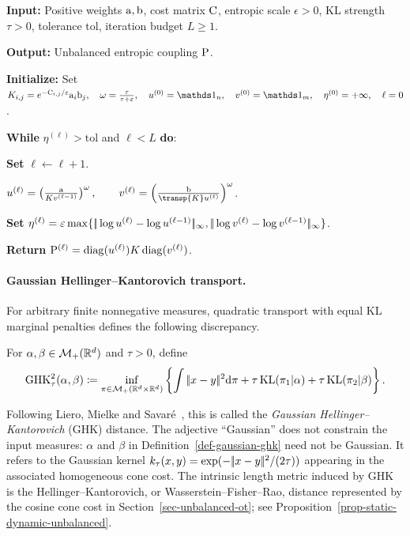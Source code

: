 \begin{alg}\label{alg:unbalanced-sinkhorn}
\textbf{Input:} Positive weights $\a,\b$, cost matrix $\C$, entropic scale $\epsilon>0$, KL strength $\tau>0$, tolerance $\mathrm{tol}$, iteration budget $L\geq1$.

\textbf{Output:} Unbalanced entropic coupling $\P$.

\textbf{Initialize:} Set
\(K_{i,j}=e^{-\C_{i,j}/\epsilon}\a_i\b_j, \quad \omega=\frac{\tau}{\tau+\epsilon}, \quad u^{(0)}=\ones_n, \quad v^{(0)}=\ones_m, \quad \eta^{(0)}=+\infty, \quad \ell=0\).

\textbf{While} \(\eta^{(\ell)}>\mathrm{tol}\) and $\ell<L$ \textbf{do}:
\begin{algblock}

\textbf{Set} \(\ell\leftarrow \ell+1\).

\(u^{(\ell)} = \left(\frac{\a}{K v^{(\ell-1)}}\right)^\omega, \qquad v^{(\ell)} = \left(\frac{\b}{\transp{K}u^{(\ell)}}\right)^\omega\).

\textbf{Set} \(\eta^{(\ell)}=\epsilon\max\{\norm{\log u^{(\ell)}-\log u^{(\ell-1)}}_\infty,\norm{\log v^{(\ell)}-\log v^{(\ell-1)}}_\infty\}\).
\end{algblock}
\algreturnskip
\textbf{Return} \(\P^{(\ell)}=\diag(u^{(\ell)})K\diag(v^{(\ell)})\).
\end{alg}

\paragraph{Gaussian Hellinger--Kantorovich transport.}
For arbitrary finite nonnegative measures, quadratic transport with equal KL marginal penalties defines the following discrepancy.
\begin{defn}\label{def-gaussian-ghk}
For $\alpha,\beta\in\Mm_+(\RR^d)$ and $\tau>0$, define
\begin{equation}\label{eq-gaussian-ghk-endpoint}
\operatorname{GHK}_\tau^2(\alpha,\beta)
\eqdef
\inf_{\pi\in\Mm_+(\RR^d\times\RR^d)}
\left\{
\int\norm{x-y}^2\d\pi
+\tau\KL(\pi_1|\alpha)
+\tau\KL(\pi_2|\beta)
\right\}.
\end{equation}
\end{defn}
Following Liero, Mielke and Savar\'e~\cite{LieroMielkeSavareLong}, this is called the \emph{Gaussian Hellinger--Kantorovich} (GHK) distance. The adjective ``Gaussian'' does not constrain the input measures: $\alpha$ and $\beta$ in Definition~\ref{def-gaussian-ghk} need not be Gaussian. It refers to the Gaussian kernel $k_\tau(x,y)=\exp(-\norm{x-y}^2/(2\tau))$ appearing in the associated homogeneous cone cost. The intrinsic length metric induced by GHK is the Hellinger--Kantorovich, or Wasserstein--Fisher--Rao, distance represented by the cosine cone cost in Section~\ref{sec-unbalanced-ot}; see Proposition~\ref{prop-static-dynamic-unbalanced}.

